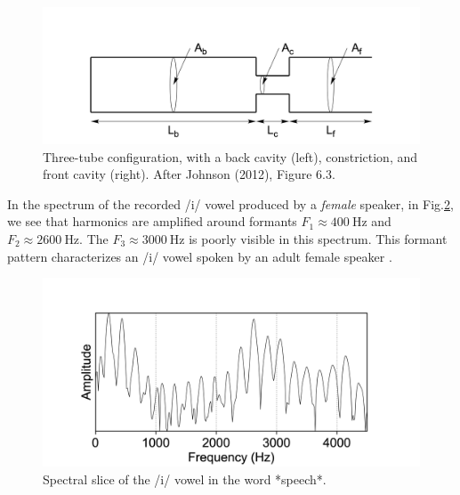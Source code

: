 \documentclass[
]{book}
\begin{document}
\begin{figure}

{\centering \includegraphics{figures/threetube} 

}

\caption{Three-tube configuration, with a back cavity (left), constriction, and front cavity (right). After Johnson (2012), Figure 6.3.}\label{fig:threetube}
\end{figure}

In the spectrum of the recorded /i/ vowel produced by a \emph{female} speaker, in Fig.\ref{fig:speech-spectralslice-i}, we see that harmonics are amplified around formants \(F_1 \approx 400\ \textrm{Hz}\) and \(F_2 \approx 2600\ \textrm{Hz}\). The \(F_3 \approx 3000\ \textrm{Hz}\) is poorly visible in this spectrum. This formant pattern characterizes an /i/ vowel spoken by an adult female speaker \citep[Table II]{Peterson_Barney_1952}.

\begin{figure}

{\centering \includegraphics{figures/speech_word_0_210_spectrum} 

}

\caption{Spectral slice of the /i/ vowel in the word *speech*.}\label{fig:speech-spectralslice-i}
\end{figure}
\end{document}
